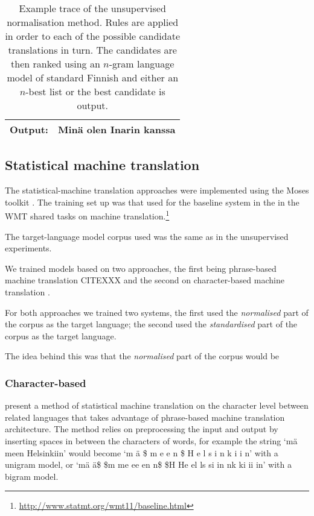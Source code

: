 \documentclass[11pt]{article}
\begin{document}
\begin{table*}
\begin{tabular}{|l|r|l|l|}
    \hline
    \textbf{Output:} & \multicolumn{3}{l|}{Min\"{a} olen Inarin kanssa} \\
    \hline
  \end{tabular}
  \caption{Example trace of the unsupervised normalisation method. Rules are applied in order to each of 
     the possible candidate translations in turn. The candidates are then ranked using an $n$-gram language model 
     of standard Finnish and either an $n$-best list
     or the best candidate is output.}
  \label{table:unsup-trace}
\end{table*}

\subsection{Statistical machine translation}


The statistical-machine translation approaches were implemented using the 
Moses toolkit \cite{koehn2007}. The training set up was that used for
the baseline system in the  in the WMT shared tasks
on machine translation.\footnote{\url{http://www.statmt.org/wmt11/baseline.html}}

The target-language model corpus used was the same as in the unsupervised experiments. 

We trained models based on two approaches, the first being phrase-based machine translation
CITEXXX and the second on character-based machine translation \cite{nakov2012,TiedemannEAMT2009}.

For both approaches we trained two systems, the first used the \emph{normalised}
part of the corpus as the target language; the second used the \emph{standardised} 
part of the corpus as the target language.

The idea behind this was that the \emph{normalised} part of the corpus would be 

\subsubsection{Character-based}

 present a method of statistical machine translation on the character level between related languages that takes advantage of phrase-based machine translation architecture. The method relies on preprocessing the input and output by inserting spaces in between the characters of words, for example the string `m\"{a} meen Helsinkiin' would become `m \"{a} \$ m e e n \$ H e l s i n k i i n' with a unigram model, or `m\"{a} \"{a}\$ \$m me ee en n\$ \$H He el ls si in nk ki ii in' with a bigram model.
\end{document}

